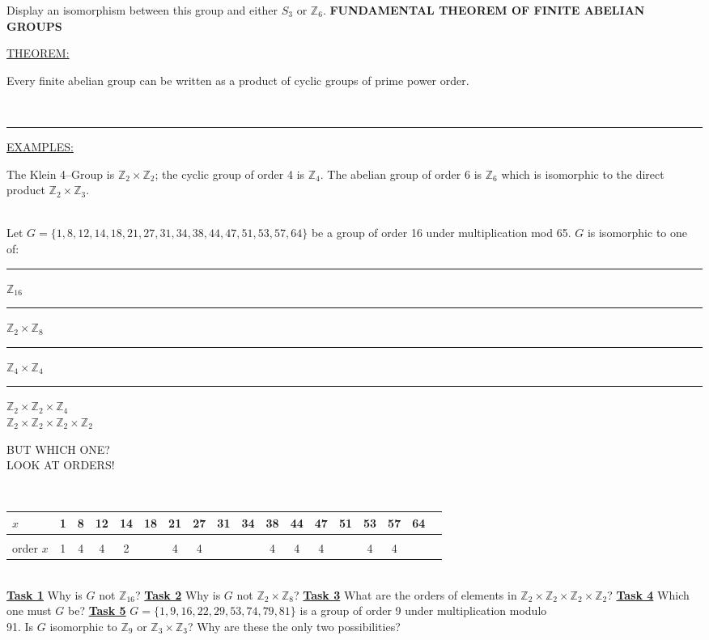 \documentclass[12pt, fleqn, twoside]{book}
\makeatletter
\def\cleardoublepage{\clearpage\if@twoside \ifodd\c@page\else
   \hbox{}\thispagestyle{empty}\newpage\if@twocolumn\hbox{}\newpage\fi\fi\fi}
\makeatother
\begin{document}
Display an isomorphism between this group and either $S_3$ or $\mathbb{Z}_6$.
%
%
%
\cleardoublepage
%
%
%
{\large \bf 	FUNDAMENTAL THEOREM OF FINITE ABELIAN GROUPS}\\[.25in]%
\underline{THEOREM:} \parbox[t]{5in}{Every finite abelian group can be written as a product of cyclic groups of prime power order.}\\[.25in]
\rule{.06in}{0in}\underline{EXAMPLES:} \parbox[t]{5in}{The Klein 4--Group is $\mathbb{Z}_2\times \mathbb{Z}_2$; the cyclic group of order 4 is $\mathbb{Z}_4$.  The abelian group of order 6 is $\mathbb{Z}_6$ which is isomorphic to the direct product $\mathbb{Z}_2 \times \mathbb{Z}_3$.}\\[.25in]
Let $G=\{1, 8, 12, 14, 18, 21, 27, 31, 34, 38, 44, 47, 51, 53, 57, 64\}$ be a group of order 16 under multiplication mod 65.  $G$ is isomorphic to one of:\\[.25in]
\parbox{3in}{\rule{.5in}{0in}$\mathbb{Z}_{16}$\\
\rule{.35in}{0in}$\mathbb{Z}_2 \times \mathbb{Z}_8$\\
\rule{.35in}{0in}$\mathbb{Z}_4 \times \mathbb{Z}_4$\\
\rule{.2in}{0in}$\mathbb{Z}_2 \times \mathbb{Z}_2 \times \mathbb{Z}_4$\\
$\mathbb{Z}_2 \times \mathbb{Z}_2 \times \mathbb{Z}_2 \times \mathbb{Z}_2$}%
\parbox{3in}{BUT WHICH ONE?\\[.25in] LOOK AT ORDERS!}\\[.25in]
\begin{tabular}{l|ccccccccccccccccc}
$x$ & 1 & 8 & 12 & 14 & 18 & 21 & 27 & 31 & 34 & 38 & 44 & 47 & 51 & 53 & 57 & 64\\
\hline\\[-.1in]
order $x$ & 1 & 4 & 4 & 2 & & 4 & 4 & & & 4& 4 & 4 & & 4 & 4&
\end{tabular}\\[.25in]
\underline{\bf{Task 1}} Why is $G$ not $\mathbb{Z}_{16}$?\vfill
\underline{\bf{Task 2}} Why is $G$ not $\mathbb{Z}_2 \times \mathbb{Z}_8$?\vfill
\underline{\bf{Task 3}} What are the orders of elements in $\mathbb{Z}_2\times \mathbb{Z}_2\times \mathbb{Z}_2\times \mathbb{Z}_2$?\vfill
\underline{\bf{Task 4}} Which one must $G$ be?\vfill
%
%
\cleardoublepage
%
%
\underline{\bf{Task 5}} $G =\{1, 9, 16, 22, 29, 53, 74, 79, 81\}$ is a  group of order 9 under multiplication modulo\\[.2in] 91.  Is $G$ isomorphic to $\mathbb{Z}_9$ or $\mathbb{Z}_3 \times \mathbb{Z}_3$?  Why are these the only two possibilities?\\[.2in]
\end{document}
